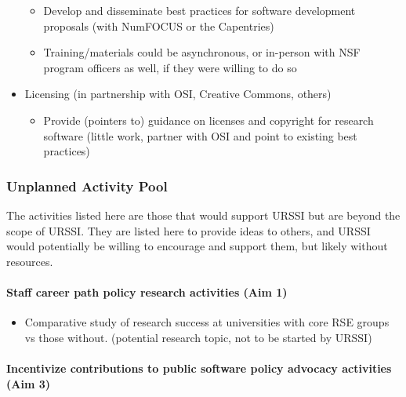 \documentclass[
]{book}
\providecommand{\tightlist}{%
  \setlength{\itemsep}{0pt}\setlength{\parskip}{0pt}}
\begin{document}
\begin{itemize}
  \begin{itemize}
  \item
    Develop and disseminate best practices for software development proposals (with NumFOCUS or
    the Capentries)
  \item
    Training/materials could be asynchronous, or in-person with NSF program officers as well, if
    they were willing to do so
  \end{itemize}
\item
  Licensing (in partnership with OSI, Creative Commons, others)

  \begin{itemize}
  \tightlist
  \item
    Provide (pointers to) guidance on licenses and copyright for research software (little work,
    partner with OSI and point to existing best practices)
  \end{itemize}
\end{itemize}

\hypertarget{unplanned-activity-pool}{%
\subsubsection{Unplanned Activity Pool}\label{unplanned-activity-pool}}

The activities listed here are those that would support URSSI but are beyond the scope of URSSI.
They are listed here to provide ideas to others, and URSSI would potentially be willing to encourage
and support them, but likely without resources.

\hypertarget{staff-career-path-policy-research-activities-aim-1}{%
\paragraph{Staff career path policy research activities (Aim 1)}\label{staff-career-path-policy-research-activities-aim-1}}

\begin{itemize}
\tightlist
\item
  Comparative study of research success at universities with core RSE groups vs those without.
  (potential research topic, not to be started by URSSI)
\end{itemize}

\hypertarget{incentivize-contributions-to-public-software-policy-advocacy-activities-aim-3}{%
\paragraph{Incentivize contributions to public software policy advocacy activities (Aim 3)}\label{incentivize-contributions-to-public-software-policy-advocacy-activities-aim-3}}
\end{document}

